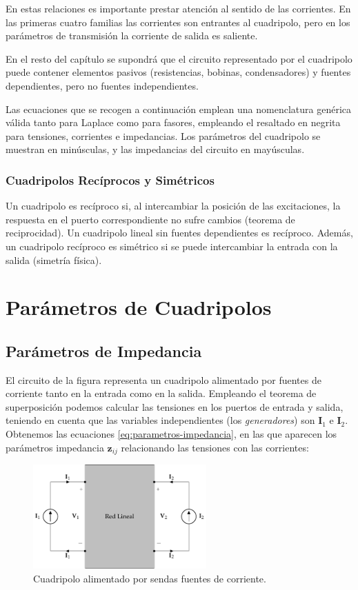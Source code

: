 En estas relaciones es importante prestar atención al sentido de las corrientes. En las primeras cuatro familias las corrientes son entrantes al cuadripolo, pero en los parámetros de transmisión la corriente de salida es saliente.

En el resto del capítulo se supondrá que el circuito representado por el cuadripolo puede contener elementos pasivos (resistencias, bobinas, condensadores) y fuentes dependientes, pero no fuentes independientes.

Las ecuaciones que se recogen a continuación emplean una nomenclatura genérica válida tanto para Laplace como para fasores, empleando el resaltado en negrita para tensiones, corrientes e impedancias. Los parámetros del cuadripolo se muestran en minúsculas, y las impedancias del circuito en mayúsculas.

\subsubsection{Cuadripolos Recíprocos y Simétricos}

Un cuadripolo es recíproco si, al intercambiar la posición de las excitaciones, la respuesta en el puerto correspondiente no sufre cambios (teorema de reciprocidad). Un cuadripolo lineal sin fuentes dependientes es recíproco. Además, un cuadripolo recíproco es simétrico si se puede intercambiar la entrada con la salida (simetría física).

\section{Parámetros de Cuadripolos}

\subsection{Parámetros de Impedancia}
\label{sec:impedancia}

El circuito de la figura representa un cuadripolo alimentado por fuentes de corriente tanto en la entrada como en la salida. Empleando el teorema de superposición podemos calcular las tensiones en los puertos de entrada y salida, teniendo en cuenta que las variables independientes (los \emph{generadores}) son \(\mathbf{I}_1\) e \(\mathbf{I}_2\). Obtenemos las ecuaciones \ref{eq:parametros-impedancia}, en las que aparecen los parámetros impedancia $\mathbf{z}_{ij}$ relacionando las tensiones con las corrientes: 

\begin{figure}[H]
  \centering
  \includegraphics[height=4cm]{../figs/cuadripolo_fuentes_corriente.pdf}
  \caption{Cuadripolo alimentado por sendas fuentes de corriente.}
  \label{fig:cuadripolo-impedancia}
\end{figure}


